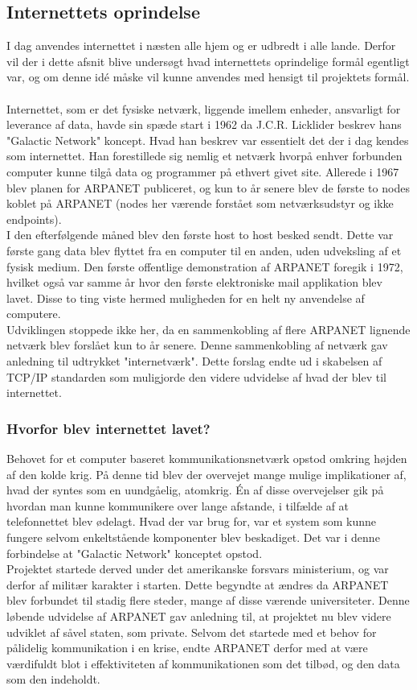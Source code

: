 \subsection{Internettets oprindelse}
I dag anvendes internettet i næsten alle hjem og er udbredt i alle lande. Derfor vil der i dette afsnit blive undersøgt hvad internettets oprindelige formål egentligt var, og om denne idé måske vil kunne anvendes med hensigt til projektets formål. 
\\\\
\noindent 
Internettet, som er det fysiske netværk, liggende imellem enheder, ansvarligt for leverance af data, havde sin spæde start i 1962 da J.C.R. Licklider beskrev hans "Galactic Network" koncept. Hvad han beskrev var essentielt det der i dag kendes som internettet. Han forestillede sig nemlig et netværk hvorpå enhver forbunden computer kunne tilgå data og programmer på ethvert givet site. Allerede i 1967 blev planen for ARPANET publiceret, og kun to år senere blev de første to nodes koblet på ARPANET (nodes her værende forstået som netværksudstyr og ikke endpoints).\\ 
I den efterfølgende måned blev den første host to host besked sendt. Dette var første gang data blev flyttet fra en computer til en anden, uden udveksling af et fysisk medium. Den første offentlige demonstration af ARPANET foregik i 1972, hvilket også var samme år hvor den første elektroniske mail applikation blev lavet. 
Disse to ting viste hermed muligheden for en helt ny anvendelse af computere.\cite{brief_history_of_the_internet}
\\\noindent
Udviklingen stoppede ikke her, da en sammenkobling af flere ARPANET lignende netværk blev forslået kun to år senere. Denne sammenkobling af netværk gav anledning til udtrykket "internetværk". Dette forslag endte ud i skabelsen af TCP/IP standarden som muligjorde den videre udvidelse af hvad der blev til internettet.\cite{The_development_of_the_internet}

\subsubsection{Hvorfor blev internettet lavet?}
Behovet for et computer baseret kommunikationsnetværk opstod omkring højden af den kolde krig. På denne tid blev der overvejet mange mulige implikationer af, hvad der syntes som en uundgåelig, atomkrig. Én af disse overvejelser gik på hvordan man kunne kommunikere over lange afstande, i tilfælde af at telefonnettet blev ødelagt. Hvad der var brug for, var et system som kunne fungere selvom enkeltstående komponenter blev beskadiget. Det var i denne forbindelse at "Galactic Network" konceptet opstod.\cite{The_Invention_of_the_Internet}
\\\noindent
Projektet startede derved under det amerikanske forsvars ministerium, og var derfor af militær karakter i starten. Dette begyndte at ændres da ARPANET blev forbundet til stadig flere steder, mange af disse værende universiteter. Denne løbende udvidelse af ARPANET gav anledning til, at projektet nu blev videre udviklet af såvel staten, som private. Selvom det startede med et behov for pålidelig kommunikation i en krise, endte ARPANET derfor med at være værdifuldt blot i effektiviteten af kommunikationen som det tilbød, og den data som den indeholdt.
